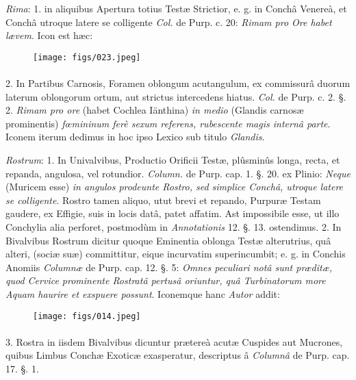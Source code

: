 \documentclass[a4paper, 11pt, oneside, polutonikogreek, german]{article}
\begin{document}
\emph{Rima}: 1. in aliquibus Apertura totius Testæ Strictior, e. g. in Conchâ Venereà, et Conchâ utroque latere se colligente \emph{Col.} de Purp. c. 20: \emph{Rimam pro Ore habet lævem}. Icon est hæc:

\begin{figure}[H]
\centering
\texttt{[image: figs/023.jpeg]}
\end{figure}
\paragraph{}
2. In Partibus Carnosis, Foramen oblongum acutangulum, ex commissurâ duorum laterum oblongorum ortum, aut strictus intercedens hiatus. \emph{Col.} de Purp. c. 2. §. 2. \emph{Rimam pro ore} (habet Cochlea Iänthina) \emph{in medio} (Glandis carnosæ prominentis) \emph{fœmininum ferè sexum referens, rubescente magis internâ parte}. Iconem iterum dedimus in hoc ipso Lexico sub titulo \emph{Glandis}.

\emph{Rostrum}: 1. In Univalvibus, Productio Orificii Testæ, plûsminûs longa, recta, et repanda, angulosa, vel rotundior. \emph{Column.} de Purp. cap. 1. §. 20. ex Plinio: \emph{Neque} (Muricem esse) \emph{in angulos prodeunte Rostro, sed simplice Conchâ, utroque latere se colligente}. Rostro tamen aliquo, utut brevi et repando, Purpuræ Testam gaudere, ex Effigie, suis in locis datâ, patet affatim. Ast impossibile esse, ut illo Conchylia alia perforet, postmodùm in \emph{Annotationis} 12. §. 13. ostendimus. 2. In Bivalvibus Rostrum dicitur quoque Eminentia oblonga Testæ alterutrius, quâ alteri, (sociæ suæ) committitur, eique incurvatim superincumbit; e. g. in Conchis Anomiis \emph{Columnæ} de Purp. cap. 12. §. 5: \emph{Omnes peculiari notâ sunt præditæ, quod Cervice prominente Rostratâ pertusâ oriuntur, quâ Turbinatorum more Aquam haurire et exspuere possunt}. Iconemque hanc \emph{Autor} addit:

\begin{figure}[H]
\centering
\texttt{[image: figs/014.jpeg]}
\end{figure}
\paragraph{}
3. Rostra in iisdem Bivalvibus dicuntur prætereà acutæ Cuspides aut Mucrones, quibus Limbus Conchæ Exoticæ exasperatur, descriptus â \emph{Columnâ} de Purp. cap. 17. §. 1.
\end{document}
